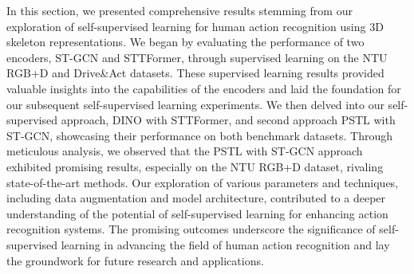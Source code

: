 In this section, we presented comprehensive results stemming from our exploration of self-supervised learning for human action recognition using 3D skeleton representations. We began by evaluating the performance of two encoders, ST-GCN and STTFormer, through supervised learning on the NTU RGB+D and Drive\&Act datasets. These supervised learning results provided valuable insights into the capabilities of the encoders and laid the foundation for our subsequent self-supervised learning experiments. We then delved into our self-supervised approach, DINO with STTFormer, and second approach PSTL with ST-GCN, showcasing their performance on both benchmark datasets. Through meticulous analysis, we observed that the PSTL with ST-GCN approach exhibited promising results, especially on the NTU RGB+D dataset, rivaling state-of-the-art methods. Our exploration of various parameters and techniques, including data augmentation and model architecture, contributed to a deeper understanding of the potential of self-supervised learning for enhancing action recognition systems. The promising outcomes underscore the significance of self-supervised learning in advancing the field of human action recognition and lay the groundwork for future research and applications.